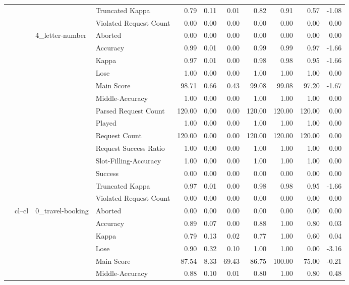 \begin{tabular}{llllrrrrrrr}
 &  &  & Truncated Kappa & 0.79 & 0.11 & 0.01 & 0.82 & 0.91 & 0.57 & -1.08 \\
 &  &  & Violated Request Count & 0.00 & 0.00 & 0.00 & 0.00 & 0.00 & 0.00 & 0.00 \\
\cline{3-11}
 &  & \multirow[t]{14}{*}{4_letter-number} & Aborted & 0.00 & 0.00 & 0.00 & 0.00 & 0.00 & 0.00 & 0.00 \\
 &  &  & Accuracy & 0.99 & 0.01 & 0.00 & 0.99 & 0.99 & 0.97 & -1.66 \\
 &  &  & Kappa & 0.97 & 0.01 & 0.00 & 0.98 & 0.98 & 0.95 & -1.66 \\
 &  &  & Lose & 1.00 & 0.00 & 0.00 & 1.00 & 1.00 & 1.00 & 0.00 \\
 &  &  & Main Score & 98.71 & 0.66 & 0.43 & 99.08 & 99.08 & 97.20 & -1.67 \\
 &  &  & Middle-Accuracy & 1.00 & 0.00 & 0.00 & 1.00 & 1.00 & 1.00 & 0.00 \\
 &  &  & Parsed Request Count & 120.00 & 0.00 & 0.00 & 120.00 & 120.00 & 120.00 & 0.00 \\
 &  &  & Played & 1.00 & 0.00 & 0.00 & 1.00 & 1.00 & 1.00 & 0.00 \\
 &  &  & Request Count & 120.00 & 0.00 & 0.00 & 120.00 & 120.00 & 120.00 & 0.00 \\
 &  &  & Request Success Ratio & 1.00 & 0.00 & 0.00 & 1.00 & 1.00 & 1.00 & 0.00 \\
 &  &  & Slot-Filling-Accuracy & 1.00 & 0.00 & 0.00 & 1.00 & 1.00 & 1.00 & 0.00 \\
 &  &  & Success & 0.00 & 0.00 & 0.00 & 0.00 & 0.00 & 0.00 & 0.00 \\
 &  &  & Truncated Kappa & 0.97 & 0.01 & 0.00 & 0.98 & 0.98 & 0.95 & -1.66 \\
 &  &  & Violated Request Count & 0.00 & 0.00 & 0.00 & 0.00 & 0.00 & 0.00 & 0.00 \\
\cline{2-11} \cline{3-11}
 & \multirow[t]{70}{*}{cl--cl} & \multirow[t]{14}{*}{0_travel-booking} & Aborted & 0.00 & 0.00 & 0.00 & 0.00 & 0.00 & 0.00 & 0.00 \\
 &  &  & Accuracy & 0.89 & 0.07 & 0.00 & 0.88 & 1.00 & 0.80 & 0.03 \\
 &  &  & Kappa & 0.79 & 0.13 & 0.02 & 0.77 & 1.00 & 0.60 & 0.04 \\
 &  &  & Lose & 0.90 & 0.32 & 0.10 & 1.00 & 1.00 & 0.00 & -3.16 \\
 &  &  & Main Score & 87.54 & 8.33 & 69.43 & 86.75 & 100.00 & 75.00 & -0.21 \\
 &  &  & Middle-Accuracy & 0.88 & 0.10 & 0.01 & 0.80 & 1.00 & 0.80 & 0.48 \\

\end{tabular}
